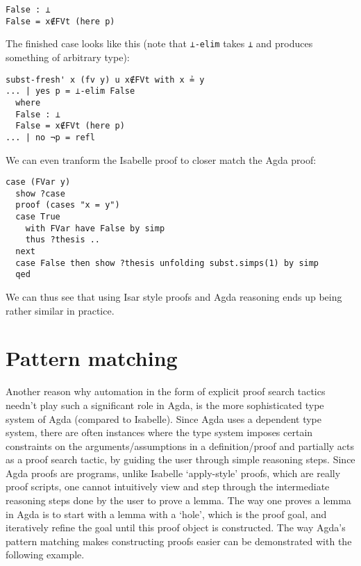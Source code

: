 \documentclass[a4paper, 12pt, twoside]{style/ociamthesis}
\theoremstyle{plain}
\theoremstyle{definition}
\theoremstyle{remark}
\begin{document}
\begin{verbatim}
False : ⊥
False = x∉FVt (here p)
\end{verbatim}

The finished case looks like this (note that \texttt{⊥-elim} takes
\texttt{⊥} and produces something of arbitrary type):

\begin{verbatim}
subst-fresh' x (fv y) u x∉FVt with x ≟ y
... | yes p = ⊥-elim False
  where
  False : ⊥
  False = x∉FVt (here p)
... | no ¬p = refl
\end{verbatim}

We can even tranform the Isabelle proof to closer match the Agda proof:

\begin{verbatim}
case (FVar y)
  show ?case
  proof (cases "x = y")
  case True
    with FVar have False by simp
    thus ?thesis ..
  next
  case False then show ?thesis unfolding subst.simps(1) by simp
  qed
\end{verbatim}

We can thus see that using Isar style proofs and Agda reasoning ends up
being rather similar in practice.

\section{Pattern matching}\label{pattern-matching}

Another reason why automation in the form of explicit proof search
tactics needn't play such a significant role in Agda, is the more
sophisticated type system of Agda (compared to Isabelle). Since Agda
uses a dependent type system, there are often instances where the type
system imposes certain constraints on the arguments/assumptions in a
definition/proof and partially acts as a proof search tactic, by guiding
the user through simple reasoning steps. Since Agda proofs are programs,
unlike Isabelle `apply-style' proofs, which are really proof scripts,
one cannot intuitively view and step through the intermediate reasoning
steps done by the user to prove a lemma. The way one proves a lemma in
Agda is to start with a lemma with a `hole', which is the proof goal,
and iteratively refine the goal until this proof object is constructed.
The way Agda's pattern matching makes constructing proofs easier can be
demonstrated with the following example.
\end{document}
